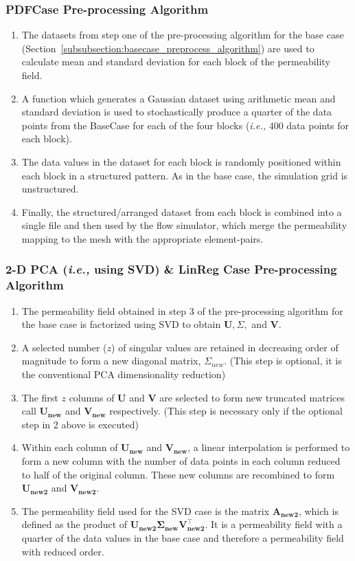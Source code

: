 \documentclass[preprint,12pt]{elsarticle}
\newcommand{\ie}{{\it i.e., }}
\begin{document}
\subsubsection{PDFCase Pre-processing Algorithm}\label{subsubsection:pdfcase_preprocess_algorithm}
\begin{enumerate}[1.]
  \item The datasets from step one of the pre-processing algorithm for the base case (Section~\ref{subsubsection:basecase_preprocess_algorithm}) are used to calculate mean and standard deviation for each block of the permeability field.
  \item A function which generates a Gaussian dataset using arithmetic mean and standard deviation is used to stochastically produce a quarter of the data points from the BaseCase for each of the four blocks  (\ie $400$ data points for each block).
  \item The data values in the dataset for each block is randomly positioned within each block in a structured pattern. As in the base case, the simulation grid is unstructured.
  \item Finally, the structured/arranged dataset from each block is combined into a single file and then used by the flow simulator, which merge the permeability mapping to the mesh with the appropriate element-pairs.
\end{enumerate}

\subsubsection{2-D PCA (\ie{using SVD}) \& LinReg Case Pre-processing Algorithm}\label{subsubsection:svdcase_preprocess_algorithm}
\begin{enumerate}[1.]
  \item The permeability field obtained in step 3 of the pre-processing algorithm for the base case is factorized using SVD to obtain $\mathbf{U}, \Sigma,$ and $\mathbf{V}$.
  \item A selected number ($z$) of singular values are retained in decreasing order of magnitude to form a new diagonal matrix, $\Sigma_{new}$. (This step is optional, it is the conventional PCA dimensionality reduction)
  \item The first $z$ columns of $\mathbf{U}$ and $\mathbf{V}$ are selected to form new truncated matrices call $\mathbf{U_{new}}$ and $\mathbf{V_{new}}$ respectively. (This step is necessary only if the optional step in 2 above is executed)
  \item Within each column of $\mathbf{U_{new}}$ and $\mathbf{V_{new}}$, a linear interpolation is performed to form a new column with the number of data points in each column reduced to half of the original column. These new columns are recombined to form $\mathbf{U_{new2}}$ and $\mathbf{V_{new2}}$.
  \item The permeability field used for the SVD case is the matrix $\mathbf{A_{new2}}$, which is defined as the product of $\mathbf{U_{new2}} \mathbf{\Sigma_{new}} \mathbf{V_{new2}^{\intercal}}$. It is a permeability field with a quarter of the data values in the base case and therefore a permeability field with reduced order.  
\end{enumerate}
\end{document}
